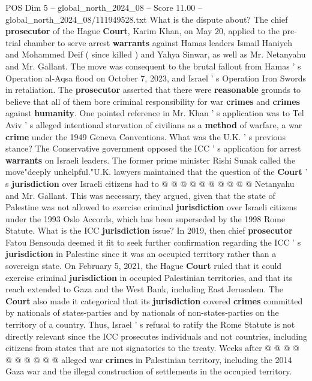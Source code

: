 \begin{textsample}{POS Dim 5 – global\_north\_2024\_08 – Score 11.00 – global\_north\_2024\_08/111949528.txt}  \label{ex:f5_pos_393}
What is the dispute about?
The chief \textbf{prosecutor} of the Hague \textbf{Court}, Karim Khan, on May 20, applied to the pre-trial chamber to serve arrest \textbf{warrants} against Hamas leaders Ismail Haniyeh and Mohammed Deif ( since killed ) and Yahya Sinwar, as well as Mr.
Netanyahu and Mr.
Gallant.
The move was consequent to the brutal fallout from Hamas ' s Operation al-Aqsa flood on October 7, 2023, and Israel ' s Operation Iron Swords in retaliation.
The \textbf{prosecutor} asserted that there were \textbf{reasonable} grounds to believe that all of them bore criminal responsibility for war \textbf{crimes} and \textbf{crimes} against \textbf{humanity}.
One pointed reference in Mr.
Khan ' s application was to Tel Aviv ' s alleged intentional starvation of civilians as a \textbf{method} of warfare, a war \textbf{crime} under the 1949 Geneva Conventions.
What was the U.K. ' s previous stance?
The Conservative government opposed the ICC ' s application for arrest \textbf{warrants} on Israeli leaders.
The former prime minister Rishi Sunak called the move"deeply unhelpful."U.K. lawyers maintained that the question of the \textbf{Court} ' s \textbf{jurisdiction} over Israeli citizens had to @ @ @ @ @ @ @ @ @ @ Netanyahu and Mr.
Gallant.
This was necessary, they argued, given that the state of Palestine was not allowed to exercise criminal \textbf{jurisdiction} over Israeli citizens under the 1993 Oslo Accords, which has been superseded by the 1998 Rome Statute.
What is the ICC \textbf{jurisdiction} issue?
In 2019, then chief \textbf{prosecutor} Fatou Bensouda deemed it fit to seek further confirmation regarding the ICC ' s \textbf{jurisdiction} in Palestine since it was an occupied territory rather than a sovereign state.
On February 5, 2021, the Hague \textbf{Court} ruled that it could exercise criminal \textbf{jurisdiction} in occupied Palestinian territories, and that its reach extended to Gaza and the West Bank, including East Jerusalem.
The \textbf{Court} also made it categorical that its \textbf{jurisdiction} covered \textbf{crimes} committed by nationals of states-parties and by nationals of non-states-parties on the territory of a country.
Thus, Israel ' s refusal to ratify the Rome Statute is not directly relevant since the ICC prosecutes individuals and not countries, including citizens from states that are not signatories to the treaty.
Weeks after @ @ @ @ @ @ @ @ @ @ alleged war \textbf{crimes} in Palestinian territory, including the 2014 Gaza war and the illegal construction of settlements in the occupied territory.

\end{textsample}
